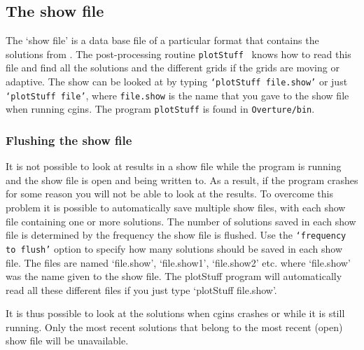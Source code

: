 \subsection{The show file}

   The `show file' is a data base file of a particular format that
contains the solutions from \Solver. The post-processing routine
{\tt plotStuff}~\cite{PLOTSTUFF}
 knows how to read this file and find all the solutions
and the different grids if the grids are moving or adaptive. The show can
be looked at by typing {\tt `plotStuff file.show'} or just {\tt `plotStuff file'},
where {\tt file.show}
is the name that you gave to the show file when running cgins.
The program {\tt plotStuff} is found in {\tt Overture/bin}.

\subsubsection{Flushing the show file} \label{sec:flush}
  It is not possible to look at results in a show file while the program is 
running and the show file
is open and being written to. As a result, if the program crashes for some
reason you will not be able to look at the results. To overcome this 
problem it is possible to automatically save multiple show files, with each
show file containing one or more solutions. The number of solutions saved
in each show file is determined by the frequency the show file is flushed.
Use the {\tt `frequency to flush'}
option to specify how many solutions should be saved in each show file.
The files are named `file.show', `file.show1', `file.show2' etc. where
`file.show' was the name given to the show file.
The plotStuff program will automatically read all these different files if
you just type `plotStuff file.show'.

It is thus possible to look at the solutions when cgins crashes or
while it is still running. 
Only the most recent solutions that
belong to the most recent (open) show file will be unavailable.
